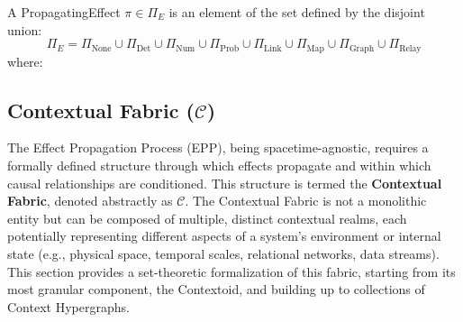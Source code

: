 \begin{definition}[PropagatingEffect]
\label{def:propagating_effect}
 A PropagatingEffect \(\pi \in \Pi_E\) is an element of the set defined by the disjoint union:
\[ \Pi_E = \Pi_{\text{None}} \cup \Pi_{\text{Det}} \cup \Pi_{\text{Num}} \cup \Pi_{\text{Prob}} \cup \Pi_{\text{Link}} \cup \Pi_{\text{Map}} \cup \Pi_{\text{Graph}} \cup \Pi_{\text{Relay}} \]
where:
\end{definition}

\subsection{Contextual Fabric (\(\mathcal{C}\))}
\label{sec:formalization_context}

The Effect Propagation Process (EPP), being spacetime-agnostic, requires a formally defined structure through which effects propagate and within which causal relationships are conditioned. This structure is termed the \textbf{Contextual Fabric}, denoted abstractly as \(\mathcal{C}\). The Contextual Fabric is not a monolithic entity but can be composed of multiple, distinct contextual realms, each potentially representing different aspects of a system's environment or internal state (e.g., physical space, temporal scales, relational networks, data streams). This section provides a set-theoretic formalization of this fabric, starting from its most granular component, the Contextoid, and building up to collections of Context Hypergraphs.


